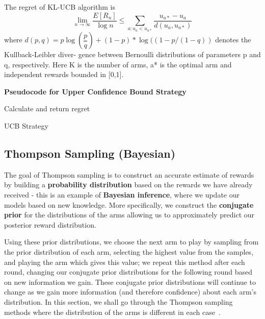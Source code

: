 The regret of KL-UCB algorithm is \[\lim_{n\to \infty} \frac{E[R_n]}{\log n} \leq  \sum_{a:u_a < u_{a*}} \frac{u_{a*}-u_a}{d(u_a,u_{a*})}  \]
where $d(p, q) = p \log(\dfrac{p}{q}) + (1 - p) * \log((1 - p/(1 - q))$ denotes the Kullback-Leibler diver- gence between Bernoulli distributions of parameters p and q, respectively.
Here K is the number of arms, a* is the optimal arm and independent rewards bounded in [0,1].\citep{Garivier2011}
\par
\textbf{Pseudocode for Upper Confidence Bound Strategy}
\newline
\begin{algorithm}[H]
        Calculate and return regret
        \caption{UCB Strategy}\label{alg:ucb_algorithm}
    \end{algorithm}

\subsection{Thompson Sampling (Bayesian)}\label{subsec:thompson-sampling-(bayesian)}
The goal of Thompson sampling is to construct an accurate estimate of rewards by building a \textbf{probability distribution} based on the rewards we have already received - this is an example of \textbf{Bayesian inference}, where we update our models based on new knowledge.
More specifically, we construct the \textbf{conjugate prior} for the distributions of the arms allowing us to approximately predict our posterior reward distribution.

Using these prior distributions, we choose the next arm to play by sampling from the prior distribution of each arm, selecting the highest value from the samples, and playing the arm which gives this value;
we repeat this method after each round, changing our conjugate prior distributions for the following round based on new information we gain.
These conjugate prior distributions will continue to change as we gain more information (and therefore confidence) about each arm's distribution.
In this section, we shall go through the Thompson sampling methods where the distribution of the arms is different in each case~\citep{agrawal2012analysis}.

